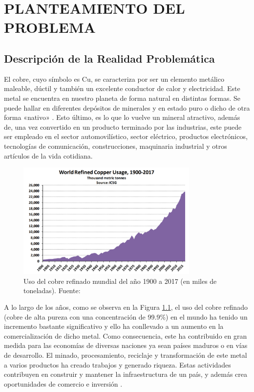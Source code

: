 \chapter{PLANTEAMIENTO DEL PROBLEMA}
\section{Descripción de la Realidad Problemática}

El cobre, cuyo símbolo es Cu, se caracteriza por ser un elemento metálico maleable, dúctil y también un excelente conductor de calor y electricidad. Este metal se encuentra en nuestro planeta de forma natural en distintas formas. Se puede hallar en diferentes depósitos de minerales y en estado puro o dicho de otra forma «nativo» \parencite{cu_internationalcopper2018}. Esto último, es lo que lo vuelve un mineral atractivo, además de, una vez convertido en un producto terminado por las industrias, este puede ser empleado en el sector automovilístico, sector eléctrico, productos electrónicos, tecnologías de comunicación, construcciones, maquinaria industrial  y otros artículos de la vida cotidiana. %



\begin{figure}[h]
	\begin{center}
		\includegraphics[width=0.8\textwidth]{1/figures/world_refined_copper_usage.png}
		\caption{Uso del cobre refinado mundial del año 1900 a 2017 (en miles de toneladas). Fuente: \cite{cu_internationalcopper2018}}
		\label{1:fig}
	\end{center}
\end{figure}

A lo largo de los años, como se observa en la Figura \ref{1:fig}, el uso del cobre refinado (cobre de alta pureza con una concentración de 99.9\%) en el mundo ha tenido un incremento bastante significativo y ello ha conllevado a un aumento en la comercialización de dicho metal. Como consecuencia, este ha contribuido en gran medida para las economías de diversas naciones ya sean países maduros o en vías de desarrollo. El minado, procesamiento, reciclaje y transformación de este metal a varios productos ha creado trabajos y generado riqueza. Estas actividades contribuyen en construir y mantener la infraestructura de un país, y además crea oportunidades de comercio e inversión \parencite{cu_internationalcopper2018}.



